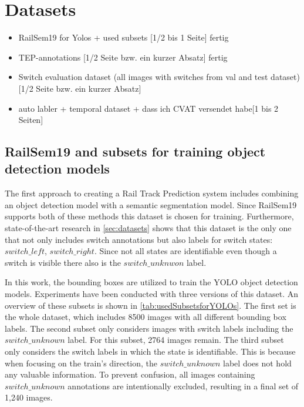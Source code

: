\section{Datasets}

\begin{itemize}
    \item RailSem19 for Yolos + used subsets [1/2 bis 1 Seite] fertig
    \item TEP-annotations [1/2 Seite bzw. ein kurzer Absatz] fertig
    \item Switch evaluation dataset (all images with switches from val and test dataset) [1/2 Seite bzw. ein kurzer Absatz]
    \item auto labler + temporal dataset + dass ich CVAT versendet habe[1 bis 2 Seiten]
\end{itemize}

\subsection{RailSem19 and subsets for training object detection models}

The first approach to creating a Rail Track Prediction system includes combining an object detection model with a semantic segmentation model.
Since RailSem19 supports both of these methods this dataset is chosen for training.
Furthermore, state-of-the-art research in \autoref{sec:datasets} shows that this dataset is the only one that not only includes switch annotations but also labels for switch states: $switch\_left$, $switch\_right$.
Since not all states are identifiable even though a switch is visible there also is the $switch\_unknwon$ label.

In this work, the bounding boxes are utilized to train the \ac{YOLO} object detection models.
Experiments have been conducted with three versions of this dataset.
An overview of these subsets is shown in \autoref{tab:usedSubsetsforYOLOs}.
The first set is the whole dataset, which includes 8500 images with all different bounding box labels.
The second subset only considers images with switch labels including the $switch\_unknown$ label.
For this subset, 2764 images remain. The third subset only considers the switch labels in which the state is identifiable.
This is because when focusing on the train's direction, the $switch\_unknown$ label does not hold any valuable information.
To prevent confusion, all images containing $switch\_unknown$ annotations are intentionally excluded, resulting in a final set of 1,240 images.

